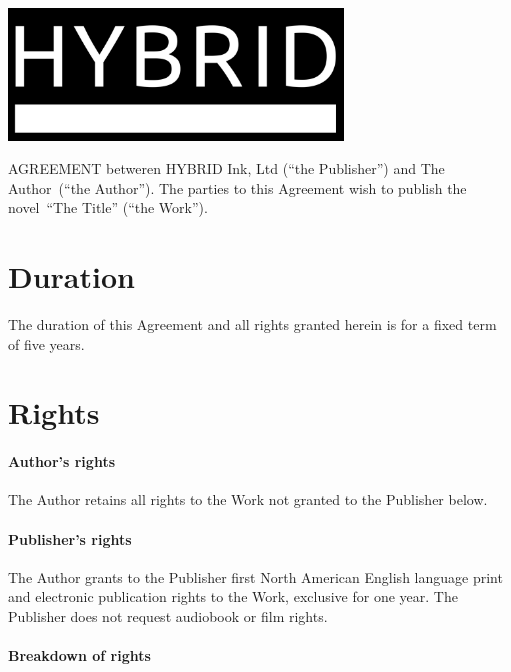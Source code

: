 \documentclass[12pt,letterpaper]{article}
\def\WorkTitle{The Title}
\def\WorkAuthor{The Author}
\def\WorkType{novel}
\begin{document}
\begin{center}
\noindent\includegraphics[width=3.5in]{logo}
\end{center}

\vspace{0.5in}

\noindent AGREEMENT betweren HYBRID Ink, Ltd (``the Publisher'') and \WorkAuthor\ (``the Author''). The parties to this Agreement wish to publish the \WorkType\ ``\WorkTitle'' (``the Work'').

\section{Duration}

The duration of this Agreement and all rights granted herein is for a fixed term of five years.

\section{Rights}

\paragraph{Author's rights}

The Author retains all rights to the Work not granted to the Publisher below.

\paragraph{Publisher's rights}

The Author grants to the Publisher first North American English language print and electronic publication rights to the Work, exclusive for one year. The Publisher does not request audiobook or film rights.

\paragraph{Breakdown of rights}
\end{document}
